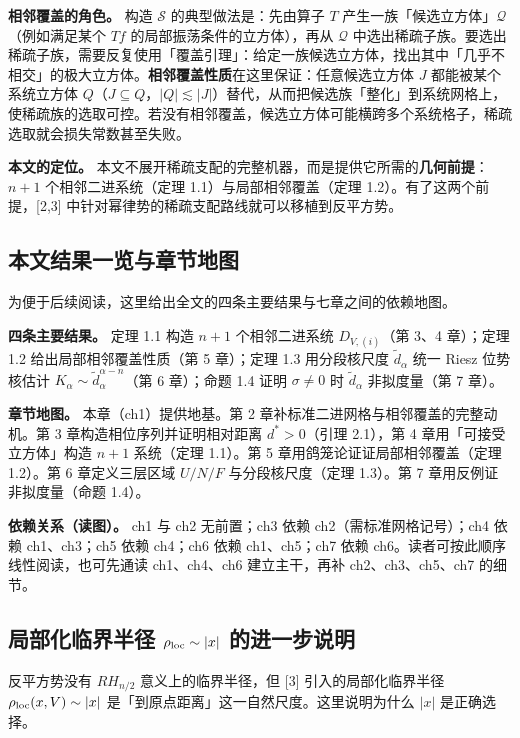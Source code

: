 \documentclass[a4paper,11pt,openany]{ctexbook}
\numberwithin{equation}{chapter}
\numberwithin{figure}{chapter}
\numberwithin{table}{chapter}
\begin{document}
\textbf{相邻覆盖的角色。} 构造 $\mathcal S$ 的典型做法是：先由算子 $T$ 产生一族「候选立方体」$\mathcal Q$（例如满足某个 $Tf$ 的局部振荡条件的立方体），再从 $\mathcal Q$ 中选出稀疏子族。要选出稀疏子族，需要反复使用「覆盖引理」：给定一族候选立方体，找出其中「几乎不相交」的极大立方体。\textbf{相邻覆盖性质}在这里保证：任意候选立方体 $J$ 都能被某个系统立方体 $Q$（$J\subseteq Q$，$|Q|\lesssim|J|$）替代，从而把候选族「整化」到系统网格上，使稀疏族的选取可控。若没有相邻覆盖，候选立方体可能横跨多个系统格子，稀疏选取就会损失常数甚至失败。

\textbf{本文的定位。} 本文不展开稀疏支配的完整机器，而是提供它所需的\textbf{几何前提}：$n+1$ 个相邻二进系统（定理 1.1）与局部相邻覆盖（定理 1.2）。有了这两个前提，[2,3] 中针对幂律势的稀疏支配路线就可以移植到反平方势。

\subsection{本文结果一览与章节地图}

为便于后续阅读，这里给出全文的四条主要结果与七章之间的依赖地图。

\textbf{四条主要结果。} 定理 1.1 构造 $n+1$ 个相邻二进系统 $D_{V,(i)}$（第 3、4 章）；定理 1.2 给出局部相邻覆盖性质（第 5 章）；定理 1.3 用分段核尺度 $\widetilde d_\alpha$ 统一 Riesz 位势核估计 $K_\alpha\sim\widetilde d_\alpha^{\alpha-n}$（第 6 章）；命题 1.4 证明 $\sigma\neq0$ 时 $\widetilde d_\alpha$ 非拟度量（第 7 章）。

\textbf{章节地图。} 本章（ch1）提供地基。第 2 章补标准二进网格与相邻覆盖的完整动机。第 3 章构造相位序列并证明相对距离 $d^*>0$（引理 2.1），第 4 章用「可接受立方体」构造 $n+1$ 系统（定理 1.1）。第 5 章用鸽笼论证证局部相邻覆盖（定理 1.2）。第 6 章定义三层区域 $U/N/F$ 与分段核尺度（定理 1.3）。第 7 章用反例证非拟度量（命题 1.4）。

\textbf{依赖关系（读图）。} ch1 与 ch2 无前置；ch3 依赖 ch2（需标准网格记号）；ch4 依赖 ch1、ch3；ch5 依赖 ch4；ch6 依赖 ch1、ch5；ch7 依赖 ch6。读者可按此顺序线性阅读，也可先通读 ch1、ch4、ch6 建立主干，再补 ch2、ch3、ch5、ch7 的细节。

\subsection{局部化临界半径 $\rho_{\rm loc}\sim|x|$ 的进一步说明}

反平方势没有 $RH_{n/2}$ 意义上的临界半径，但 [3] 引入的局部化临界半径 $\rho_{\rm loc}(x,V)\sim|x|$ 是「到原点距离」这一自然尺度。这里说明为什么 $|x|$ 是正确选择。
\end{document}
